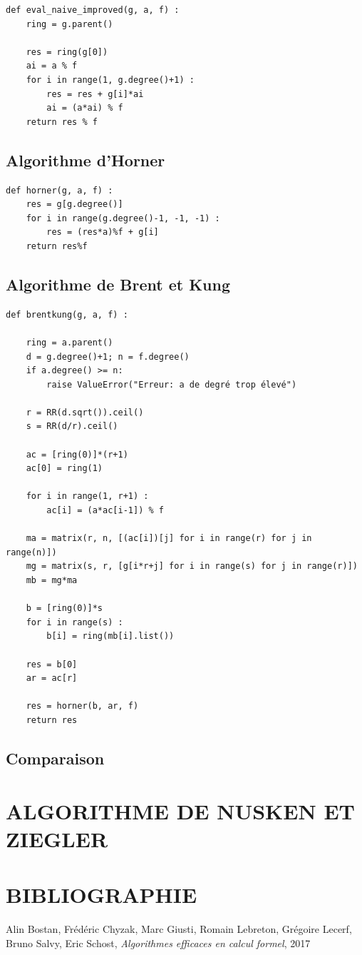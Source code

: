 \documentclass[a4paper]{article}
\begin{document}
\begin{lstlisting}[frame=leftline, title={naive}]
def eval_naive_improved(g, a, f) :
	ring = g.parent()

	res = ring(g[0])
	ai = a % f
	for i in range(1, g.degree()+1) :
		res = res + g[i]*ai
		ai = (a*ai) % f
	return res % f
\end{lstlisting}

\subsection{Algorithme d'Horner}

\begin{lstlisting}[frame=leftline, title={Horner}]
def horner(g, a, f) :
    res = g[g.degree()]
    for i in range(g.degree()-1, -1, -1) :
        res = (res*a)%f + g[i]
    return res%f
\end{lstlisting}

\subsection{Algorithme de Brent et Kung}

\begin{lstlisting}[frame=leftline, title={brent and kung}]
def brentkung(g, a, f) :

	ring = a.parent()
	d = g.degree()+1; n = f.degree()
	if a.degree() >= n:
		raise ValueError("Erreur: a de degré trop élevé")

	r = RR(d.sqrt()).ceil()
	s = RR(d/r).ceil()

	ac = [ring(0)]*(r+1)
	ac[0] = ring(1)

	for i in range(1, r+1) :
		ac[i] = (a*ac[i-1]) % f

	ma = matrix(r, n, [(ac[i])[j] for i in range(r) for j in range(n)])
	mg = matrix(s, r, [g[i*r+j] for i in range(s) for j in range(r)])
	mb = mg*ma

	b = [ring(0)]*s
	for i in range(s) :
		b[i] = ring(mb[i].list())

	res = b[0]
	ar = ac[r]

	res = horner(b, ar, f)
	return res
\end{lstlisting}

\subsection{Comparaison}


\section{ALGORITHME DE NUSKEN ET ZIEGLER}



\newpage
\section{BIBLIOGRAPHIE}

\begin{thebibliography}{10}
     Alin Bostan, Frédéric Chyzak, Marc Giusti, Romain Lebreton, Grégoire Lecerf, Bruno Salvy, Eric Schost,
    \emph{Algorithmes efficaces en calcul formel}, 2017

\end{thebibliography}
\end{document}
